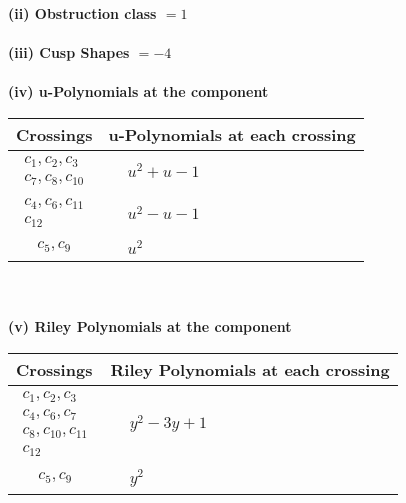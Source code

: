 \documentclass[1p]{elsarticle_modified}
\theoremstyle{definition}
\begin{document}
\flushleft \textbf{(ii) Obstruction class $= 1$}\\~\\
\flushleft \textbf{(iii) Cusp Shapes $= -4$}\\~\\
\newpage\renewcommand{\arraystretch}{1}
\flushleft \textbf{(iv) u-Polynomials at the component}\newline \\
\begin{tabular}{m{50pt}|m{274pt}}
Crossings & \hspace{64pt}u-Polynomials at each crossing \\
\hline $$\begin{aligned}c_{1},c_{2},c_{3}\\c_{7},c_{8},c_{10}\end{aligned}$$&$\begin{aligned}
&u^2+u-1
\end{aligned}$\\
\hline $$\begin{aligned}c_{4},c_{6},c_{11}\\c_{12}\end{aligned}$$&$\begin{aligned}
&u^2- u-1
\end{aligned}$\\
\hline $$\begin{aligned}c_{5},c_{9}\end{aligned}$$&$\begin{aligned}
&u^2
\end{aligned}$\\
\hline
\end{tabular}\\~\\
\newpage\renewcommand{\arraystretch}{1}
\flushleft \textbf{(v) Riley Polynomials at the component}\newline \\
\begin{tabular}{m{50pt}|m{274pt}}
Crossings & \hspace{64pt}Riley Polynomials at each crossing \\
\hline $$\begin{aligned}c_{1},c_{2},c_{3}\\c_{4},c_{6},c_{7}\\c_{8},c_{10},c_{11}\\c_{12}\end{aligned}$$&$\begin{aligned}
&y^2-3 y+1
\end{aligned}$\\
\hline $$\begin{aligned}c_{5},c_{9}\end{aligned}$$&$\begin{aligned}
&y^2
\end{aligned}$\\
\hline
\end{tabular}\\~\\
\end{document}
